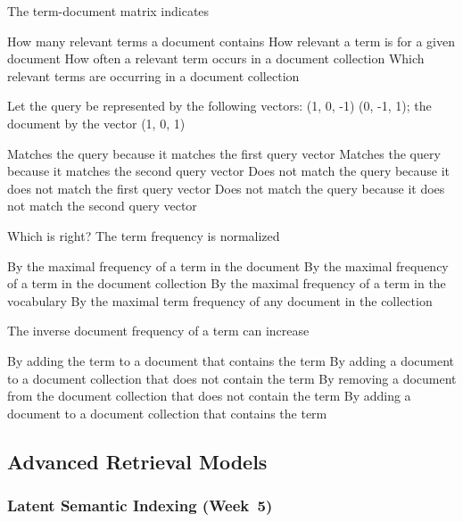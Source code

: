 \documentclass[12pt,a4paper]{exam} %
\begin{document}
\begin{flushleft}
\begin{multicols*}{2}
\begin{questions}
\question The term-document matrix indicates
\begin{checkboxes}
\CorrectChoice How many relevant terms a document contains
\choice How relevant a term is for a given document
\CorrectChoice How often a relevant term occurs in a document collection
\CorrectChoice Which relevant terms are occurring in a document collection
\end{checkboxes}

\question Let the query be represented by the following vectors:
(1, 0, -1) (0, -1, 1); the document by the vector (1, 0, 1)
\begin{checkboxes}
\choice Matches the query because it matches the first query vector
\CorrectChoice Matches the query because it matches the second query vector
\choice Does not match the query because it does not match the first query vector
\choice Does not match the query because it does not match the second query vector
\end{checkboxes}

\question Which is right? The term frequency is normalized
\begin{checkboxes}
\CorrectChoice By the maximal frequency of a term in the document
\choice By the maximal frequency of a term in the document collection
\choice By the maximal frequency of a term in the vocabulary
\choice By the maximal term frequency of any document in the collection
\end{checkboxes}


\question The inverse document frequency of a term can increase
\begin{checkboxes}
\choice By adding the term to a document that contains the term
\CorrectChoice By adding a document to a document collection that does not
contain the term
\choice By removing a document from the document collection that
does not contain the term
\choice By adding a document to a document collection that contains
the term
\end{checkboxes}



\subsection{Advanced Retrieval Models} %

\subsubsection{Latent Semantic Indexing (Week~5)}



\end{questions}
\end{multicols*}
\end{flushleft}
\end{document}
